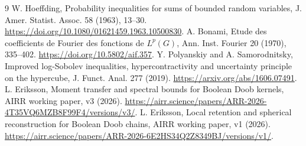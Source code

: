\documentclass[11pt]{article}
\begin{document}
\begin{thebibliography}{9}
 W. Hoeffding, Probability inequalities for sums of bounded random variables, J. Amer. Statist. Assoc. 58 (1963), 13--30. \url{https://doi.org/10.1080/01621459.1963.10500830}.
 A. Bonami, Etude des coefficients de Fourier des fonctions de $L^p(G)$, Ann. Inst. Fourier 20 (1970), 335--402. \url{https://doi.org/10.5802/aif.357}.
 Y. Polyanskiy and A. Samorodnitsky, Improved log-Sobolev inequalities, hypercontractivity and uncertainty principle on the hypercube, J. Funct. Anal. 277 (2019). \url{https://arxiv.org/abs/1606.07491}.
 L. Eriksson, Moment transfer and spectral bounds for Boolean Doob kernels, AIRR working paper, v3 (2026). \url{https://airr.science/papers/ARR-2026-4T35VQ6MZB8F99F4/versions/v3/}.
 L. Eriksson, Local retention and spherical reconstruction for Boolean Doob chains, AIRR working paper, v1 (2026). \url{https://airr.science/papers/ARR-2026-6E2HS34Q2Z8349BJ/versions/v1/}.
\end{thebibliography}
\end{document}
